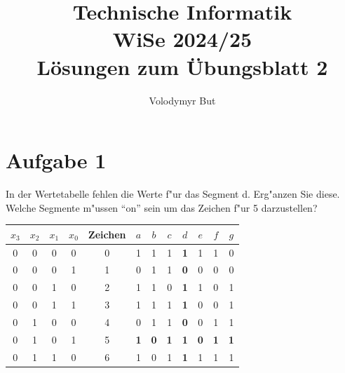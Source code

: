 \documentclass[10pt, oneside]{article}
\title{Technische Informatik\\[5pt]\Large WiSe 2024/25\\[10pt]\Large L{\"o}sungen zum {\"U}bungsblatt 2}
\author{Volodymyr But}
\date{}
\begin{document}
\sloppy

\maketitle
\vspace{25px}

\section{Aufgabe 1}

In der Wertetabelle fehlen die Werte f"ur das Segment d. Erg"anzen Sie diese.
Welche Segmente m"ussen \enquote{on} sein um das Zeichen f"ur 5 darzustellen?

\vspace{5pt}

\begin{minipage}{0.69\linewidth}
    \bgroup
    \def\arraystretch{1.25}
    \begin{tabular}{|c|c|c|c|c|c|c|c|c|c|c|c|}
        \hline
        $x_3$ & $x_2$ & $x_1$ & $x_0$ & Zeichen & $a$        & $b$        & $c$        & $d$               & $e$        & $f$        & $g$        \\
        \hline
        0     & 0     & 0     & 0     & 0       & 1          & 1          & 1          & \textbf{1}        & 1          & 1          & 0          \\
        \hline
        0     & 0     & 0     & 1     & 1       & 0          & 1          & 1          & \textbf{0}        & 0          & 0          & 0          \\
        \hline
        0     & 0     & 1     & 0     & 2       & 1          & 1          & 0          & \textbf{1}        & 1          & 0          & 1          \\
        \hline
        0     & 0     & 1     & 1     & 3       & 1          & 1          & 1          & \textbf{1}        & 0          & 0          & 1          \\
        \hline
        0     & 1     & 0     & 0     & 4       & 0          & 1          & 1          & \textbf{0}        & 0          & 1          & 1          \\
        \hline
        0     & 1     & 0     & 1     & 5       & \textbf{1} & \textbf{0} & \textbf{1} & \textbf{1}        & \textbf{0} & \textbf{1} & \textbf{1} \\
        \hline
        0     & 1     & 1     & 0     & 6       & 1          & 0          & 1          & \textbf{1}        & 1          & 1          & 1          \\

\end{tabular}
\end{minipage}
\end{document}
